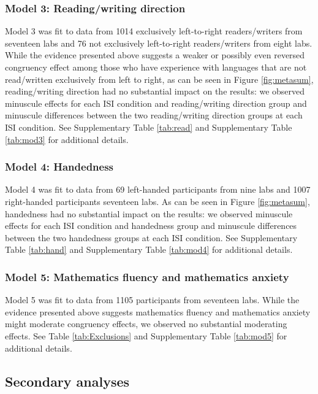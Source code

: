\documentclass[A4paper,man,floatsintext]{apa6}
\theoremstyle{definition}
\theoremstyle{definition}
\theoremstyle{definition}
\theoremstyle{remark}
\begin{document}
\subsubsection{Model 3: Reading/writing
direction}\label{model-3-readingwriting-direction-1}

Model 3 was fit to data from 1014 exclusively left-to-right
readers/writers from seventeen labs and 76 not exclusively left-to-right
readers/writers from eight labs. While the evidence presented above
suggests a weaker or possibly even reversed congruency effect among
those who have experience with languages that are not read/written
exclusively from left to right, as can be seen in Figure
\ref{fig:metasum}, reading/writing direction had no substantial impact
on the results: we observed minuscule effects for each ISI condition and
reading/writing direction group and minuscule differences between the
two reading/writing direction groups at each ISI condition. See
Supplementary Table \ref{tab:read} and Supplementary Table
\ref{tab:mod3} for additional details.

\subsubsection{Model 4: Handedness}\label{model-4-handedness-1}

Model 4 was fit to data from 69 left-handed participants from nine labs
and 1007 right-handed participants seventeen labs. As can be seen in
Figure \ref{fig:metasum}, handedness had no substantial impact on the
results: we observed minuscule effects for each ISI condition and
handedness group and minuscule differences between the two handedness
groups at each ISI condition. See Supplementary Table \ref{tab:hand} and
Supplementary Table \ref{tab:mod4} for additional details.

\subsubsection{Model 5: Mathematics fluency and mathematics
anxiety}\label{model-5-mathematics-fluency-and-mathematics-anxiety-1}

Model 5 was fit to data from 1105 participants from seventeen labs.
While the evidence presented above suggests mathematics fluency and
mathematics anxiety might moderate congruency effects, we observed no
substantial moderating effects. See Table \ref{tab:Exclusions} and
Supplementary Table \ref{tab:mod5} for additional details.

\subsection{Secondary analyses}\label{secondary-analyses-1}
\end{document}
